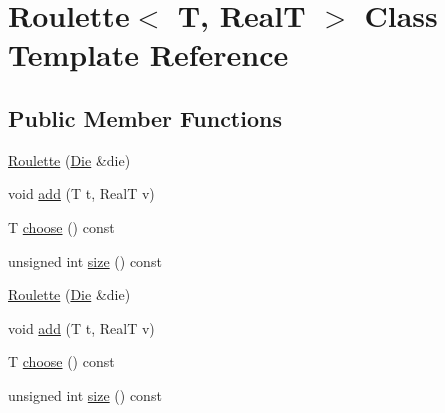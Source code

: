 \hypertarget{class_roulette}{\section{Roulette$<$ T, Real\+T $>$ Class Template Reference}
\label{class_roulette}
}
\subsection*{Public Member Functions}
\begin{DoxyCompactItemize}
\item 
\hyperlink{class_roulette_a7a3665052e6d81f3493c666748020ef4}{Roulette} (\hyperlink{class_die}{Die} \&die)
\item 
void \hyperlink{class_roulette_ac43a3ec52b47c4155a91c43186b665fb}{add} (T t, Real\+T v)
\item 
T \hyperlink{class_roulette_acf830e32e8bbde521eda0882fe80093d}{choose} () const 
\item 
unsigned int \hyperlink{class_roulette_a326ec76e4615eb7c85d7097061e60ed0}{size} () const 
\item 
\hyperlink{class_roulette_a7a3665052e6d81f3493c666748020ef4}{Roulette} (\hyperlink{class_die}{Die} \&die)
\item 
void \hyperlink{class_roulette_ac43a3ec52b47c4155a91c43186b665fb}{add} (T t, Real\+T v)
\item 
T \hyperlink{class_roulette_acf830e32e8bbde521eda0882fe80093d}{choose} () const 
\item 
unsigned int \hyperlink{class_roulette_a326ec76e4615eb7c85d7097061e60ed0}{size} () const 
\end{DoxyCompactItemize}


